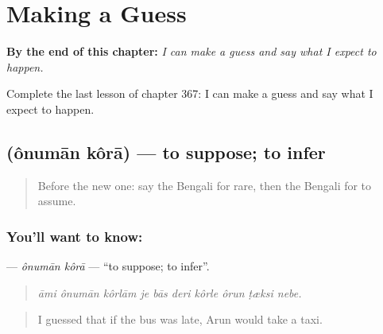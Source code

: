 
\chapter{Making a Guess}
\label{ch:bn-making-a-guess}

\begin{chapteropening}
\textbf{By the end of this chapter:} \emph{I can make a guess and say what I expect to happen.}

Complete the last lesson of chapter 367: I can make a guess and say what I expect to happen.
\end{chapteropening}

\section[\texorpdfstring{\bn{অনুমান} \bn{করা} (ônumān kôrā)}{অনুমান করা (ônumān kôrā)}]{  (ônumān kôrā) — to suppose; to infer}

\label{lesson:BN-C367-onuman-kora}



\begin{quote}
Before the new one: say the Bengali for rare, then the Bengali for to assume.
\end{quote}

\subsection*{You'll want to know:  }
\textbf{ } — \emph{ônumān kôrā} — \textquotedblleft{}to suppose; to infer\textquotedblright{}.

\begin{quote}
         
\end{quote}

\begin{quote}
\emph{āmi ônumān kôrlām je bās deri kôrle ôrun ṭæksi nebe.}
\end{quote}

\begin{quote}
I guessed that if the bus was late, Arun would take a taxi.
\end{quote}

